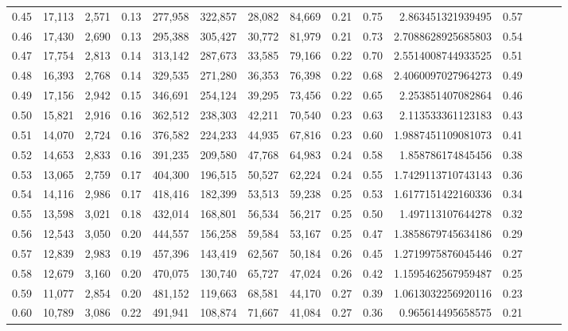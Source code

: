\begin{tabular}{rrrrrrrrrrrrrrr}
0.45 &  17,113 &  2,571 &  0.13 &  277,958 &  322,857 &   28,082 &   84,669 &  0.21 &  0.75 &       2.863451321939495 &      0.57 \\
0.46 &  17,430 &  2,690 &  0.13 &  295,388 &  305,427 &   30,772 &   81,979 &  0.21 &  0.73 &      2.7088628925685803 &      0.54 \\
0.47 &  17,754 &  2,813 &  0.14 &  313,142 &  287,673 &   33,585 &   79,166 &  0.22 &  0.70 &      2.5514008744933525 &      0.51 \\
0.48 &  16,393 &  2,768 &  0.14 &  329,535 &  271,280 &   36,353 &   76,398 &  0.22 &  0.68 &      2.4060097027964273 &      0.49 \\
0.49 &  17,156 &  2,942 &  0.15 &  346,691 &  254,124 &   39,295 &   73,456 &  0.22 &  0.65 &       2.253851407082864 &      0.46 \\
0.50 &  15,821 &  2,916 &  0.16 &  362,512 &  238,303 &   42,211 &   70,540 &  0.23 &  0.63 &       2.113533361123183 &      0.43 \\
0.51 &  14,070 &  2,724 &  0.16 &  376,582 &  224,233 &   44,935 &   67,816 &  0.23 &  0.60 &      1.9887451109081073 &      0.41 \\
0.52 &  14,653 &  2,833 &  0.16 &  391,235 &  209,580 &   47,768 &   64,983 &  0.24 &  0.58 &       1.858786174845456 &      0.38 \\
0.53 &  13,065 &  2,759 &  0.17 &  404,300 &  196,515 &   50,527 &   62,224 &  0.24 &  0.55 &      1.7429113710743143 &      0.36 \\
0.54 &  14,116 &  2,986 &  0.17 &  418,416 &  182,399 &   53,513 &   59,238 &  0.25 &  0.53 &      1.6177151422160336 &      0.34 \\
0.55 &  13,598 &  3,021 &  0.18 &  432,014 &  168,801 &   56,534 &   56,217 &  0.25 &  0.50 &       1.497113107644278 &      0.32 \\
0.56 &  12,543 &  3,050 &  0.20 &  444,557 &  156,258 &   59,584 &   53,167 &  0.25 &  0.47 &      1.3858679745634186 &      0.29 \\
0.57 &  12,839 &  2,983 &  0.19 &  457,396 &  143,419 &   62,567 &   50,184 &  0.26 &  0.45 &      1.2719975876045446 &      0.27 \\
0.58 &  12,679 &  3,160 &  0.20 &  470,075 &  130,740 &   65,727 &   47,024 &  0.26 &  0.42 &      1.1595462567959487 &      0.25 \\
0.59 &  11,077 &  2,854 &  0.20 &  481,152 &  119,663 &   68,581 &   44,170 &  0.27 &  0.39 &      1.0613032256920116 &      0.23 \\
0.60 &  10,789 &  3,086 &  0.22 &  491,941 &  108,874 &   71,667 &   41,084 &  0.27 &  0.36 &       0.965614495658575 &      0.21 \\

\end{tabular}
